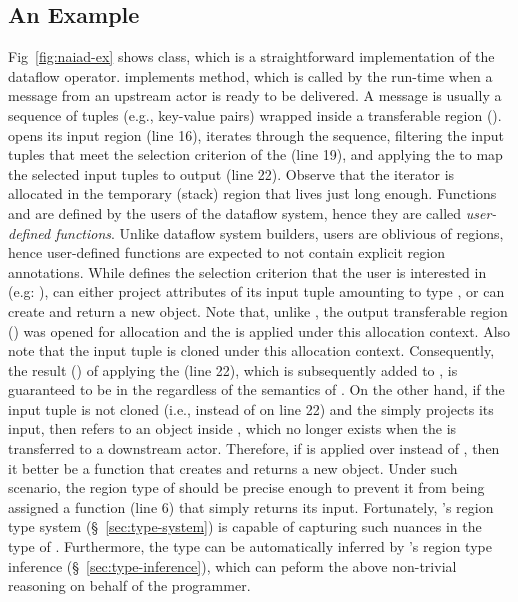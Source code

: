 \subsection{An Example}

Fig~\ref{fig:naiad-ex} shows  class, which is a
straightforward implementation of the  dataflow operator.
 implements  method, which is called by
the run-time when a message from an upstream actor is ready to be
delivered. A message is usually a sequence of tuples (e.g., key-value
pairs) wrapped inside a transferable region ().
 opens its input region  (line 16), iterates
through the sequence, filtering the input tuples that meet the
selection criterion of the  (line 19), and applying the
 to map the selected input tuples to output (line 22).
Observe that the iterator is allocated in the temporary (stack) region
 that lives just long enough.  Functions  and
 are defined by the users of the dataflow system, hence
they are called \emph{user-defined functions}.  Unlike dataflow system
builders, users are oblivious of regions, hence user-defined functions
are expected to not contain explicit region annotations. While
 defines the selection criterion that the user is
interested in (e.g: ),  can either project
attributes of its input tuple amounting to type , or can
create and return a new  object. Note that, unlike ,
the output transferable region () was opened for allocation
and the  is applied under this allocation context. Also note
that the input tuple is cloned under this allocation context.
Consequently, the result () of applying the  (line
22), which is subsequently added to , is guaranteed to be in
the  regardless of the semantics of . On the other
hand, if the input tuple is not cloned (i.e.,  instead of
 on line 22) and the  simply projects its
input, then  refers to an object inside , which no
longer exists when the  is transferred to a downstream
actor. Therefore, if  is applied over  instead of
, then it better be a function that creates and returns
a new  object. Under such scenario, the region type of
 should be precise enough to prevent it from
being assigned a function (line 6) that simply returns its input.
Fortunately, \name's region type system (\S~\ref{sec:type-system}) is
capable of capturing such nuances in the type of
. Furthermore, the type can be automatically
inferred by \name's region type inference
(\S~\ref{sec:type-inference}), which can peform the above non-trivial
reasoning on behalf of the programmer.

